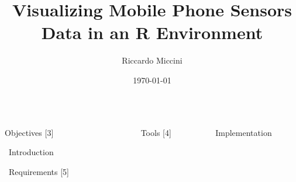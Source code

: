 \documentclass[final]{beamer}
\title{Visualizing Mobile Phone Sensors Data in an R Environment}
\author{Riccardo Miccini}
\institute{Technical University of Denmark - DTU}
\date{\today}
\newlength{\onecolwid}
\newlength{\twocolwid}
\begin{document}

\begin{frame}[t]
\begin{columns}[t]

	\begin{column}{\onecolwid}
		\begin{alertblock}{Objectives}
			\blindtext
			[3]
		\end{alertblock}

		\begin{block}{\faCommenting \, Introduction}
			\lipsum[66]
			\lipsum[75]
		\end{block}

		\begin{block}{\faListUl \, Requirements}
			\lipsum[75]
			[5]
		\end{block}
	\end{column}

	\begin{column}{\twocolwid}
		\begin{columns}[t, totalwidth=\twocolwid]
			\begin{column}{\onecolwid}\vspace{-.6in}
				\begin{block}{\faWrench \, Tools}
					\blindtext
					[4]
					\lipsum[66]
				\end{block}
			\end{column}

			\begin{column}{\onecolwid}\vspace{-.6in}
				\begin{block}{\faCode \, Implementation}
					\blindtext
					\lipsum[75]
					\lipsum[66]
				\end{block}
			\end{column}
		\end{columns}


\end{column}
\end{columns}
\end{frame}
\end{document}
